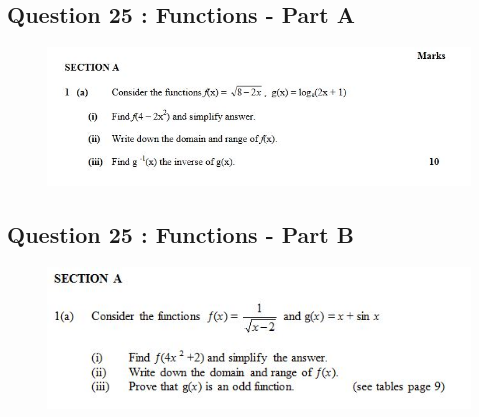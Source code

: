 \documentclass[]{article}
\begin{document}

\subsection*{Question 25 : Functions - Part A}

\begin{figure}[h!]
	\centering
	\includegraphics[width=1\linewidth]{Week7tut1}
\end{figure}
\newpage
\subsection*{Question 25 : Functions - Part B}
\begin{figure}[h!]
	\centering
	\includegraphics[width=1\linewidth]{Week7tut2}
\end{figure}

\end{document}
